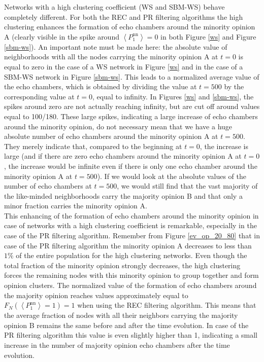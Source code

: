 \documentclass[11 pt , letterpaper , twoside , openright]{book}
\begin{document}
Networks with a high clustering coefficient (WS and SBM-WS) behave completely different. For both the REC and PR filtering algorithms the high clustering enhances the formation of echo chambers around the minority opinion A (clearly visible in the spike around $\left<P_1^{\text{nn}}\right> = 0$ in both Figure \ref{ws} and Figure \ref{sbm-ws}). An important note must be made here: the absolute value of neighborhoods with all the nodes carrying the minority opinion A at $t=0$ is equal to zero in the case of a WS network in Figure \ref{ws} and in the case of a SBM-WS network in Figure \ref{sbm-ws}. This leads to a normalized average value of the echo chambers, which is obtained by dividing the value at $t=500$ by the corresponding value at $t=0$, equal to infinity. In Figures \ref{ws} and \ref{sbm-ws}, the spikes around zero are not actually reaching infinity, but are cut off around values equal to 100/180. These large spikes, indicating a large increase of echo chambers around the minority opinion, do not necessary mean that we have a huge absolute number of echo chambers around the minority opinion A at $t=500$. They merely indicate that, compared to the beginning at $t=0$, the increase is large (and if there are zero echo chambers around the minority opinion A at $t=0$, the increase would be infinite even if there is only one echo chamber around the minority opinion A at $t=500$). If we would look at the absolute values of the number of echo chambers at $t=500$, we would still find that the vast majority of the like-minded neighborhoods carry the majority opinion B and that only a minor fraction carries the minority opinion A.\\
\newline
This enhancing of the formation of echo chambers around the minority opinion in case of networks with a high clustering coefficient is remarkable, especially in the case of the PR filtering algorithm. Remember from Figure \ref{ev_op_20_80} that in case of the PR filtering algorithm the minority opinion A decreases to less than $1 \%$ of the entire population for the high clustering networks. Even though the total fraction of the minority opinion strongly decreases, the high clustering forces the remaining nodes with this minority opinion to group together and form opinion clusters. The normalized value of the formation of echo chambers around the majority opinion reaches values approximately equal to $F_N(\left<P_1^{\text{nn}}\right> = 1) = 1$ when using the REC filtering algorithm. This means that the average fraction of nodes with all their neighbors carrying the majority opinion B remains the same before and after the time evolution. In case of the PR filtering algorithm this value is even slightly higher than 1, indicating a small increase in the number of majority opinion echo chambers after the time evolution. 
\end{document}
